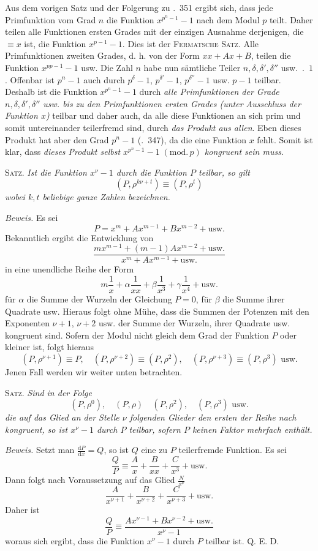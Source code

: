 Aus dem vorigen Satz und der Folgerung zu \textsection.\ 351 ergibt sich, dass jede Primfunktion vom Grad $n$ die Funktion $x^{p^n-1}-1$ nach dem Modul $p$ teilt. Daher teilen alle Funktionen ersten Grades mit der einzigen Ausnahme derjenigen, die $\equiv x$ ist, die Funktion $x^{p-1}-1$. Dies ist der \textsc{Fermatsche Satz}. Alle Primfunktionen zweiten Grades, d. h. von der Form $xx+Ax+B$, teilen die Funktion $x^{pp-1}-1$ usw. Die Zahl $n$ habe nun sämtliche Teiler $n,\delta,\delta',\delta''$ usw.\ .\ $1$. Offenbar ist $p^n-1$ auch durch $p^\delta-1$, $p^{\delta'}-1$, $p^{\delta''}-1$ usw. $p-1$ teilbar. Deshalb ist die Funktion $x^{p^n-1}-1$ durch \emph{alle Primfunktionen der Grade $n,\delta,\delta',\delta''$ usw. bis zu den Primfunktionen ersten Grades (unter Ausschluss der Funktion $x$)} teilbar und daher auch, da alle diese Funktionen an sich prim und somit untereinander teilerfremd sind, durch \emph{das Produkt aus allen}. Eben dieses Produkt hat aber den Grad $p^n-1$ (\textsection.\ 347), da die eine Funktion $x$ fehlt. Somit ist klar, dass \emph{dieses Produkt selbst $x^{p^n-1}-1\;(\mathrm{mod.}\,p)$ kongruent sein muss.}

\textsc{Satz.} \emph{Ist die Funktion $x^\nu-1$ durch die Funktion $P$ teilbar, so gilt}
\[
(P,\rho^{k\nu+t})\equiv(P,\rho^t)
\]
\emph{wobei $k,t$ beliebige ganze Zahlen bezeichnen.}

\emph{Beweis.} Es sei
\[
P=x^m+Ax^{m-1}+Bx^{m-2}+\text{usw.}
\]
Bekanntlich ergibt die Entwicklung von
\[
\frac{mx^{m-1}+(m-1)Ax^{m-2}+\text{usw.}}{x^m+Ax^{m-1}+\text{usw.}}
\]
in eine unendliche Reihe der Form
\[
m\frac1x+\alpha\frac1{xx}+\beta\frac1{x^3}+\gamma\frac1{x^4}+\text{usw.}
\]
für $\alpha$ die Summe der Wurzeln der Gleichung $P=0$, für $\beta$ die Summe ihrer Quadrate usw. Hieraus folgt ohne Mühe, dass die Summen der Potenzen mit den Exponenten $\nu+1$, $\nu+2$ usw. der Summe der Wurzeln, ihrer Quadrate usw. kongruent sind. Sofern der Modul nicht gleich dem Grad der Funktion $P$ oder kleiner ist, folgt hieraus
\[
(P,\rho^{\nu+1})\equiv P,\quad(P,\rho^{\nu+2})\equiv(P,\rho^2),\quad(P,\rho^{\nu+3})\equiv(P,\rho^3)\text{ usw.}
\]
Jenen Fall werden wir weiter unten betrachten.

\textsc{Satz.} \emph{Sind in der Folge}
\[
(P,\rho^0),\quad(P,\rho)\quad(P,\rho^2),\quad(P,\rho^3)\text{ usw.}
\]
\emph{die auf das Glied an der Stelle $\nu$ folgenden Glieder den ersten der Reihe nach kongruent, so ist $x^\nu-1$ durch $P$ teilbar, sofern $P$ keinen Faktor mehrfach enthält.}

\emph{Beweis.} Setzt man $\frac{\mathrm{d}P}{\mathrm{d}x}=Q$, so ist $Q$ eine zu $P$ teilerfremde Funktion. Es sei
\[
\frac QP\equiv\frac Ax+\frac B{xx}+\frac C{x^3}+\text{usw.}
\]
Dann folgt nach Voraussetzung auf das Glied $\frac N{x^\nu}$
\[
\frac A{x^{\nu+1}}+\frac B{x^{\nu+2}}+\frac C{x^{\nu+3}}+\text{usw.}
\]
Daher ist
\[
\frac QP\equiv\frac{Ax^{\nu-1}+Bx^{\nu-2}+\text{usw.}}{x^\nu-1}
\]
woraus sich ergibt, dass die Funktion $x^\nu-1$ durch $P$ teilbar ist. Q. E. D.
